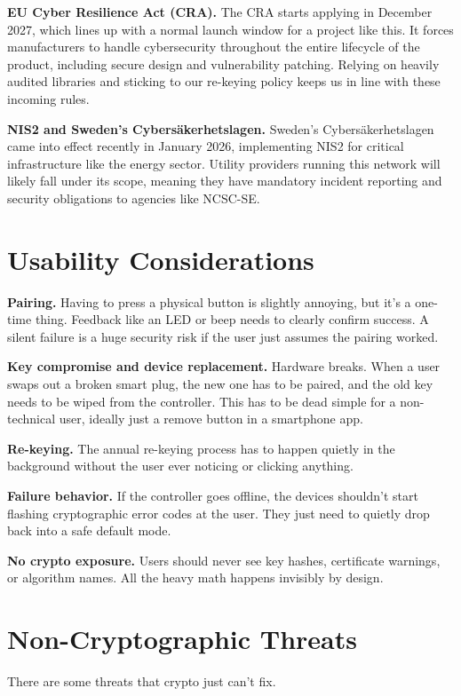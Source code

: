\documentclass[a4paper,11pt]{article}
\begin{document}
\textbf{EU Cyber Resilience Act (CRA).} The CRA starts applying in December 2027, which lines up with a normal launch window for a project like this. It forces manufacturers to handle cybersecurity throughout the entire lifecycle of the product, including secure design and vulnerability patching. Relying on heavily audited libraries and sticking to our re-keying policy keeps us in line with these incoming rules.

\textbf{NIS2 and Sweden's Cybersäkerhetslagen.} Sweden's Cybersäkerhetslagen came into effect recently in January 2026, implementing NIS2 for critical infrastructure like the energy sector. Utility providers running this network will likely fall under its scope, meaning they have mandatory incident reporting and security obligations to agencies like NCSC-SE.

\section{Usability Considerations}

\textbf{Pairing.} Having to press a physical button is slightly annoying, but it's a one-time thing. Feedback like an LED or beep needs to clearly confirm success. A silent failure is a huge security risk if the user just assumes the pairing worked.

\textbf{Key compromise and device replacement.} Hardware breaks. When a user swaps out a broken smart plug, the new one has to be paired, and the old key needs to be wiped from the controller. This has to be dead simple for a non-technical user, ideally just a remove button in a smartphone app.

\textbf{Re-keying.} The annual re-keying process has to happen quietly in the background without the user ever noticing or clicking anything.

\textbf{Failure behavior.} If the controller goes offline, the devices shouldn't start flashing cryptographic error codes at the user. They just need to quietly drop back into a safe default mode.

\textbf{No crypto exposure.} Users should never see key hashes, certificate warnings, or algorithm names. All the heavy math happens invisibly by design.

\section{Non-Cryptographic Threats}

There are some threats that crypto just can't fix.
\end{document}
